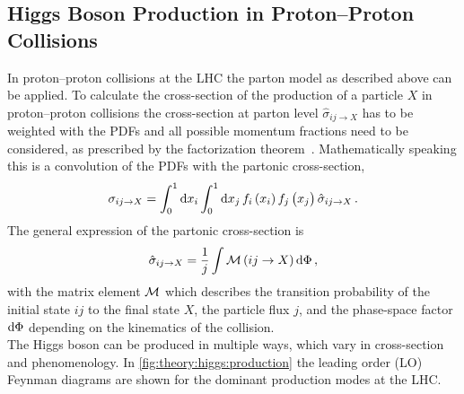 \subsection{Higgs Boson Production in Proton--Proton Collisions}
\label{sub:theory:higgs:production}

In proton--proton collisions at the LHC the parton model as described above can be applied.
To calculate the cross-section of the production of a particle $X$ in proton--proton collisions the
cross-section at parton level $\hat{\sigma}_{ij\to X}$ has to be weighted with the PDFs and all
possible momentum fractions need to be considered, as prescribed by the factorization theorem~\cite{DRELL1971578}.
Mathematically speaking this is a convolution of the PDFs with the partonic cross-section,
\begin{equation}
    \sigma_{ij\to X} = \int_{0}^{1} \dif x_i \int_{0}^{1} \dif x_j \,
    f_i \left( x_i \right ) f_j \left( x_j \right ) \hat{\sigma}_{ij\to X} \,.
\end{equation}
The general expression of the partonic cross-section is~\cite{griffiths}
\begin{equation}
    \hat{\sigma}_{ij\to X} = \frac{1}{j} \int \matrixm \left(ij \to X \right) \dif \Phi \,,
\end{equation}
with the matrix element $\mathcal{M}$ which describes the transition probability of the initial state $ij$ to the final state $X$, the
particle flux $j$, and the phase-space factor $\dif \Phi$ depending on the kinematics of the collision.
\\[\baselineskip]
The Higgs boson can be produced in multiple ways, which vary in cross-section and phenomenology.
In \cref{fig:theory:higgs:production} the leading order (LO) Feynman diagrams are shown for the dominant production modes
at the LHC\@.

